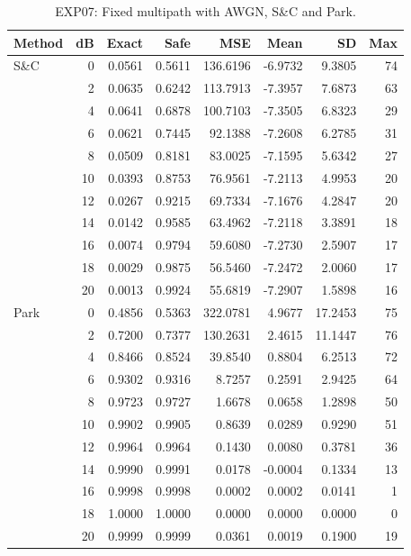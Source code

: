 \begin{table}[!p]
\centering
\caption{EXP07: Fixed multipath with AWGN, S\&C and Park.}
\label{app:exp07-1-0}
\small
\setlength{\tabcolsep}{3pt}
\renewcommand{\arraystretch}{1.05}
\begin{tabular}{lrrrrrrr}
\hline
Method & dB & Exact & Safe & MSE & Mean & SD & Max \\
\hline
S\&C & 0 & 0.0561 & 0.5611 & 136.6196 & -6.9732 & 9.3805 & 74 \\
 & 2 & 0.0635 & 0.6242 & 113.7913 & -7.3957 & 7.6873 & 63 \\
 & 4 & 0.0641 & 0.6878 & 100.7103 & -7.3505 & 6.8323 & 29 \\
 & 6 & 0.0621 & 0.7445 & 92.1388 & -7.2608 & 6.2785 & 31 \\
 & 8 & 0.0509 & 0.8181 & 83.0025 & -7.1595 & 5.6342 & 27 \\
 & 10 & 0.0393 & 0.8753 & 76.9561 & -7.2113 & 4.9953 & 20 \\
 & 12 & 0.0267 & 0.9215 & 69.7334 & -7.1676 & 4.2847 & 20 \\
 & 14 & 0.0142 & 0.9585 & 63.4962 & -7.2118 & 3.3891 & 18 \\
 & 16 & 0.0074 & 0.9794 & 59.6080 & -7.2730 & 2.5907 & 17 \\
 & 18 & 0.0029 & 0.9875 & 56.5460 & -7.2472 & 2.0060 & 17 \\
 & 20 & 0.0013 & 0.9924 & 55.6819 & -7.2907 & 1.5898 & 16 \\
\hline
Park & 0 & 0.4856 & 0.5363 & 322.0781 & 4.9677 & 17.2453 & 75 \\
 & 2 & 0.7200 & 0.7377 & 130.2631 & 2.4615 & 11.1447 & 76 \\
 & 4 & 0.8466 & 0.8524 & 39.8540 & 0.8804 & 6.2513 & 72 \\
 & 6 & 0.9302 & 0.9316 & 8.7257 & 0.2591 & 2.9425 & 64 \\
 & 8 & 0.9723 & 0.9727 & 1.6678 & 0.0658 & 1.2898 & 50 \\
 & 10 & 0.9902 & 0.9905 & 0.8639 & 0.0289 & 0.9290 & 51 \\
 & 12 & 0.9964 & 0.9964 & 0.1430 & 0.0080 & 0.3781 & 36 \\
 & 14 & 0.9990 & 0.9991 & 0.0178 & -0.0004 & 0.1334 & 13 \\
 & 16 & 0.9998 & 0.9998 & 0.0002 & 0.0002 & 0.0141 & 1 \\
 & 18 & 1.0000 & 1.0000 & 0.0000 & 0.0000 & 0.0000 & 0 \\
 & 20 & 0.9999 & 0.9999 & 0.0361 & 0.0019 & 0.1900 & 19 \\
\hline
\end{tabular}
\end{table}

